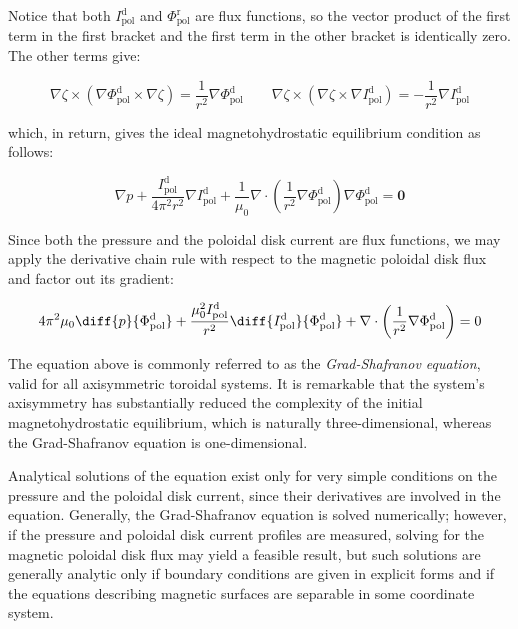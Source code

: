 Notice that both $I_\text{pol}^\mathrm{d}$ and $\Phi_\text{pol}^\text{r}$ are flux functions, so the vector product of the first term in the first bracket and the first term in the other bracket is identically zero. The other terms give:

\begin{equation}
    \nabla\zeta\times\left(\nabla\Phi_\text{pol}^\mathrm{d}\times\nabla\zeta\right)=\frac{1}{r^2}\nabla\Phi_\text{pol}^\mathrm{d}\qquad\nabla\zeta\times(\nabla\zeta\times\nabla I_\text{pol}^\mathrm{d})=-\frac{1}{r^2}\nabla I_\text{pol}^\mathrm{d}
\end{equation}

which, in return, gives the ideal magnetohydrostatic equilibrium condition as follows:

\begin{equation}
    \label{eq-6-57}
    \nabla p+\frac{I_\text{pol}^\mathrm{d}}{4\pi^2r^2}\nabla I_\text{pol}^\mathrm{d}+\frac{1}{\mu_0}\nabla\cdot\left(\frac{1}{r^2}\nabla\Phi_\text{pol}^\mathrm{d}\right)\nabla\Phi_\text{pol}^\mathrm{d}=\mathbf{0}
\end{equation}

Since both the pressure and the poloidal disk current are flux functions, we may apply the derivative chain rule with respect to the magnetic poloidal disk flux and factor out its gradient:

\begin{equation}
    \label{eq-6-58}
    4\pi^2\mu_0\diff{p}{\Phi_\text{pol}^\mathrm{d}}+\frac{\mu_0^2 I_\text{pol}^\mathrm{d}}{r^2}\diff{I_\text{pol}^\mathrm{d}}{\Phi_\text{pol}^\mathrm{d}}+\nabla\cdot\left(\frac{1}{r^2}\nabla\Phi_\text{pol}^\mathrm{d}\right)=0
\end{equation}

The equation above is commonly referred to as the \textit{Grad-Shafranov equation}, valid for all axisymmetric toroidal systems. It is remarkable that the system's axisymmetry has substantially reduced the complexity of the initial magnetohydrostatic equilibrium, which is naturally three-dimensional, whereas the Grad-Shafranov equation is one-dimensional.

\quad Analytical solutions of the equation exist only for very simple conditions on the pressure and the poloidal disk current, since their derivatives are involved in the equation. Generally, the Grad-Shafranov equation is solved numerically; however, if the pressure and poloidal disk current profiles are measured, solving for the magnetic poloidal disk flux may yield a feasible result, but such solutions are generally analytic only if boundary conditions are given in explicit forms and if the equations describing magnetic surfaces are separable in some coordinate system.

